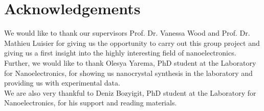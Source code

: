 \chapter*{Acknowledgements}

We would like to thank our supervisors Prof. Dr. Vanessa Wood and Prof. Dr. Mathieu Luisier for giving us the opportunity to
carry out this group project and giving us a first insight into the highly interesting field of nanoelectronics. \\

Further, we would like to thank Olesya Yarema, PhD student at the Laboratory for Nanoelectronics, for showing us
nanocrystal synthesis in the laboratory and providing us with experimental data. \\
 
We are also very thankful to Deniz Bozyigit, PhD student at the Laboratory for Nanoelectronics,
for his support and reading materials.